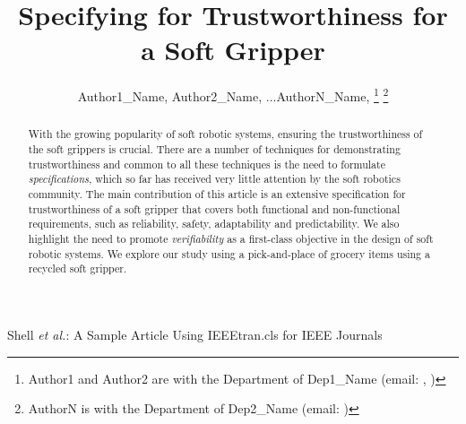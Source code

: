 \documentclass[lettersize,journal]{IEEEtran}
\begin{document}
\title{Specifying for Trustworthiness for a Soft Gripper}

\author{Author1\_Name, Author2\_Name, ...AuthorN\_Name,
	\thanks{Author1 and Author2 are with the Department of Dep1\_Name (email: , )}
	\thanks{AuthorN is with the Department of Dep2\_Name (email: )}}
%
{Shell \MakeLowercase{\textit{et al.}}: A Sample Article Using IEEEtran.cls for IEEE Journals}




\maketitle

\begin{abstract}
With the growing popularity of soft robotic systems, ensuring the trustworthiness of the soft grippers is crucial. 
There are a number of techniques for demonstrating trustworthiness and common to all these techniques is the need to formulate \emph{specifications}, which so far has received very little attention by the soft robotics community. 
The main contribution of this article is an extensive specification for trustworthiness of a soft gripper that covers both functional and non-functional requirements, such as reliability, safety, adaptability and predictability. 
We also highlight the need to promote \emph{verifiability} as a first-class objective in the design of soft robotic systems. 
We explore our study using a pick-and-place of grocery items using a recycled soft gripper.
\end{abstract}
\end{document}
